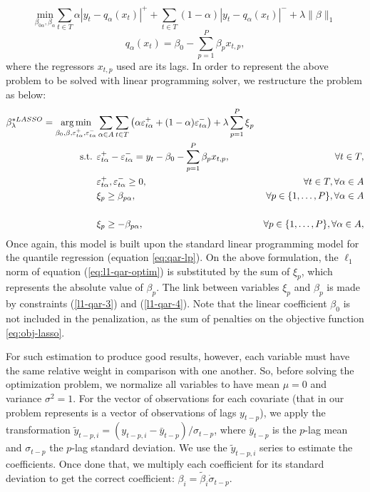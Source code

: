 \begin{equation}
  \underset{\beta_{0\alpha},\beta_\alpha}{\text{min}} \sum_{t \in T}\alpha|y_{t}-q_\alpha(x_t)|^{+}+ \sum_{t \in T}(1-\alpha)|y_{t}-q_\alpha(x_t)|^{-}+\lambda\|\beta\|_{1}
\label{eq:l1-qar-optim}
\end{equation}
\[
q_\alpha(x_t)=\beta_{0}-\sum_{p=1}^{P}\beta_{p}x_{t,p},
\]
where the regressors $x_{t,p}$ used are its lags. In order to represent the above problem to be solved with linear programming solver, we restructure the problem as below:
\begin{eqnarray}
\beta_\lambda^{*LASSO} = \operatorname*{arg\,min}_{\beta_{0},\beta,\varepsilon_{t \alpha}^{+},\varepsilon_{t \alpha}^{-}} & \sum_{\alpha \in A} \sum_{t \in T}\left(\alpha\varepsilon_{t \alpha}^{+}+(1-\alpha)\varepsilon_{t \alpha}^{-}\right)+\lambda\sum_{p=1}^{P}\mbox{\ensuremath{\xi}}_{p} \label{eq:obj-lasso} \\
\mbox{s.t. } & \varepsilon_{t \alpha}^{+}-\varepsilon_{t \alpha}^{-}=y_{t}-\beta_{0}-\sum_{p=1}^{P}\beta_{p}x_{t,p},&\forall t\in T,\\
& \varepsilon_{t \alpha}^{+},\varepsilon_{t \alpha}^{-}\geq0,&\forall t \in T, \forall \alpha \in A\\
& \xi_{p}\geq\beta_{p \alpha},&\forall p\in\{1,\dots,P\}, \forall \alpha \in A  \nonumber\\ \label{l1-qar-3}
\\
& \xi_{p}\geq-\beta_{p \alpha},&\forall p\in\{1,\dots,P\}, \forall \alpha \in A,  \nonumber \\ \label{l1-qar-4}
\end{eqnarray}
Once again, this model is built upon the standard linear programming model for the quantile regression (equation \ref{eq:qar-lp}). 
On the above formulation, the $\ell_1$ norm of equation (\ref{eq:l1-qar-optim}) is substituted by the sum of $\xi_p$, which represents the absolute value of $\beta_p$. The link between variables $\xi_p$ and $\beta_p$ is made by constraints (\ref{l1-qar-3}) and (\ref{l1-qar-4}). Note that the linear coefficient $\beta_0$ is not included in the penalization, as the sum of penalties on the objective function \ref{eq:obj-lasso}.

For such estimation to produce good results, however, each variable must have the same relative weight in comparison with one another. So, before solving the optimization problem, we normalize all variables to have mean $\mu = 0$ and variance $\sigma^2 = 1$. For the vector of observations for each covariate (that in our problem represents is a vector of observations of lags $y_{t-p}$), we apply the transformation $\tilde{y}_{t-p,i} = (y_{t-p,i} - \bar{y}_{t-p}) / \sigma_{t-p}$, where $\bar{y}_{t-p}$ is the $p$-lag mean and $\sigma_{t-p}$ the $p$-lag standard deviation. We use the $\tilde{y}_{t-p,i}$ series to estimate the coefficients. Once done that, we multiply each coefficient for its standard deviation to get the correct coefficient: $\beta_i = \tilde{\beta}_i \dot \sigma_{t-p}$.

